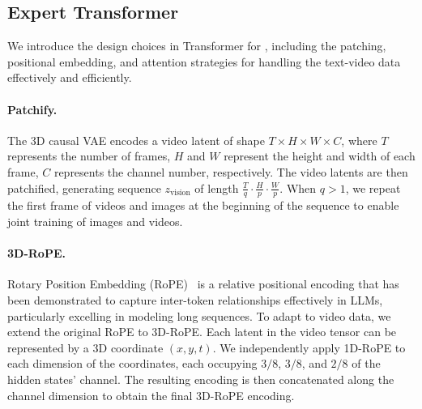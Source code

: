 
\subsection{Expert Transformer}\label{sec:expert-transformer}

We introduce the design choices in Transformer for \model, including the patching, positional embedding, and attention strategies for handling the text-video data effectively and efficiently. 

\paragraph{Patchify.}
The 3D causal VAE encodes a video latent of shape $T \times H \times W \times C$, where $T$ represents the number of frames, $H$ and $W$ represent the height and width of each frame, $C$ represents the channel number, respectively.
The video latents are then patchified, generating sequence $z_{\text{vision}}$ of length $\frac{T}{q}\cdot \frac{H}{p} \cdot \frac{W}{p}$. 
When $q > 1$, we repeat the first frame of videos and images at the beginning of the sequence to enable joint training of images and videos.

\paragraph{3D-RoPE.}
Rotary Position Embedding (RoPE)~\citep{su2024roformer} is a relative positional encoding that has been demonstrated to capture inter-token relationships effectively in LLMs, particularly excelling in modeling long sequences. 
To adapt to video data, we extend the original RoPE to 3D-RoPE. 
Each latent in the video tensor can be represented by a 3D coordinate $(x, y, t)$.
We independently apply 1D-RoPE to each dimension of the coordinates, each occupying $3/8$, $3/8$, and $2/8$ of the hidden states' channel. 
The resulting encoding is then concatenated along the channel dimension to obtain the final 3D-RoPE encoding. 



